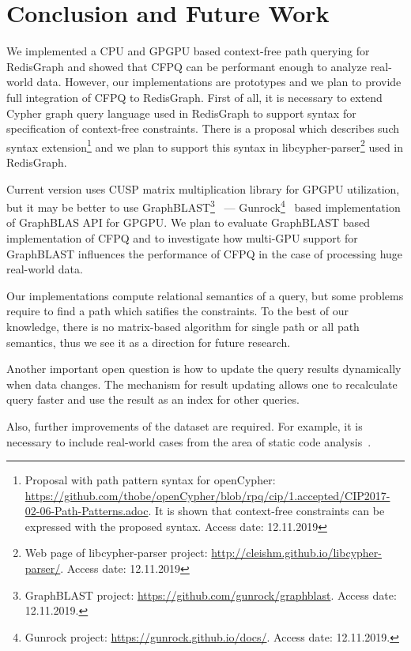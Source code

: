 \section{Conclusion and Future Work}

We implemented a CPU and GPGPU based context-free path querying for RedisGraph and showed that CFPQ can be performant enough to analyze real-world data.
However, our implementations are prototypes and we plan to provide full integration of CFPQ to RedisGraph.
First of all, it is necessary to extend Cypher graph query language used in RedisGraph to support syntax for specification of context-free constraints.
There is a proposal which describes such syntax extension\footnote{Proposal with path pattern syntax for openCypher: \url{https://github.com/thobe/openCypher/blob/rpq/cip/1.accepted/CIP2017-02-06-Path-Patterns.adoc}. It is shown that context-free constraints can be expressed with the proposed syntax. Access date: 12.11.2019} and we plan to support this syntax in libcypher-parser\footnote{Web page of libcypher-parser project: \url{http://cleishm.github.io/libcypher-parser/}. Access date: 12.11.2019} used in RedisGraph.

Current version uses CUSP matrix multiplication library for GPGPU utilization, but it may be better to use GraphBLAST\footnote{GraphBLAST project: \url{https://github.com/gunrock/graphblast}. Access date: 12.11.2019.}~\cite{yang2019graphblast} --- Gunrock\footnote{Gunrock project: \url{https://gunrock.github.io/docs/}. Access date: 12.11.2019.}~\cite{Wang:2017:GGG:3131890.3108140} based implementation of GraphBLAS API for GPGPU.
We plan to evaluate GraphBLAST based implementation of CFPQ and to investigate how multi-GPU support for GraphBLAST influences the performance of CFPQ in the case of processing huge real-world data.

Our implementations compute relational semantics of a query, but some problems require to find a path which satifies the constraints.
To the best of our knowledge, there is no matrix-based algorithm for single path or all path semantics, thus we see it as a direction for future research.

Another important open question is how to update the query results dynamically when data changes.
The mechanism for result updating allows one to recalculate query faster and use the result as an index for other queries.

Also, further improvements of the dataset are required.
For example, it is necessary to include real-world cases from the area of static code analysis~\cite{Zheng:2008:DAA:1328897.1328464,veduradabatch,LPAR-21:Cauliflower_Solver_Generator_for}.
